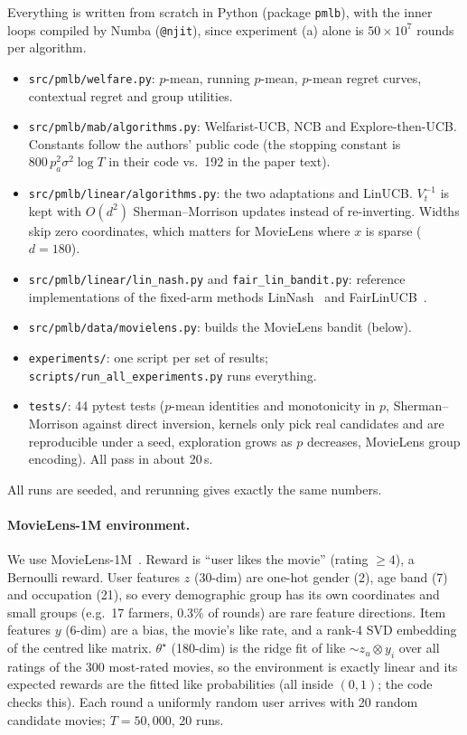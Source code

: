\documentclass[11pt,a4paper]{article}
\begin{document}
Everything is written from scratch in Python (package \texttt{pmlb}), with the inner loops compiled by Numba (\texttt{@njit}), since experiment (a) alone is $50\times10^7$ rounds per algorithm.
\begin{itemize}
  \item \texttt{src/pmlb/welfare.py}: $p$-mean, running $p$-mean, $p$-mean regret curves, contextual regret and group utilities.
  \item \texttt{src/pmlb/mab/algorithms.py}: Welfarist-UCB, NCB and Explore-then-UCB. Constants follow the authors' public code (the stopping constant is $800\,p_a^2\sigma^2\log T$ in their code vs.\ 192 in the paper text).
  \item \texttt{src/pmlb/linear/algorithms.py}: the two adaptations and LinUCB. $V_t^{-1}$ is kept with $O(d^2)$ Sherman--Morrison updates instead of re-inverting. Widths skip zero coordinates, which matters for MovieLens where $x$ is sparse ($d=180$).
  \item \texttt{src/pmlb/linear/lin\_nash.py} and \texttt{fair\_lin\_bandit.py}: reference implementations of the fixed-arm methods LinNash~\cite{sawarni2023} and FairLinUCB~\cite{sarkar2026}.
  \item \texttt{src/pmlb/data/movielens.py}: builds the MovieLens bandit (below).
  \item \texttt{experiments/}: one script per set of results; \texttt{scripts/run\_all\_experiments.py} runs everything.
  \item \texttt{tests/}: 44 pytest tests ($p$-mean identities and monotonicity in $p$, Sherman--Morrison against direct inversion, kernels only pick real candidates and are reproducible under a seed, exploration grows as $p$ decreases, MovieLens group encoding). All pass in about 20\,s.
\end{itemize}
All runs are seeded, and rerunning gives exactly the same numbers.

\paragraph{MovieLens-1M environment.} We use MovieLens-1M~\cite{harper2015}. Reward is ``user likes the movie'' (rating $\ge 4$), a Bernoulli reward. User features $z$ (30-dim) are one-hot gender (2), age band (7) and occupation (21), so every demographic group has its own coordinates and small groups (e.g.\ 17 farmers, 0.3\% of rounds) are rare feature directions. Item features $y$ (6-dim) are a bias, the movie's like rate, and a rank-4 SVD embedding of the centred like matrix. $\theta^\star$ (180-dim) is the ridge fit of like $\sim z_u\otimes y_i$ over all ratings of the 300 most-rated movies, so the environment is exactly linear and its expected rewards are the fitted like probabilities (all inside $(0,1)$; the code checks this). Each round a uniformly random user arrives with 20 random candidate movies; $T=50{,}000$, 20 runs.
\end{document}
